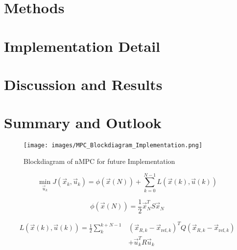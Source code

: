 \documentclass[conference]{IEEEtran}
\begin{document}




\section{Methods}



\section{Implementation Detail}



\section{Discussion and Results}




\section{Summary and Outlook}

\begin{figure}[!h]
    \centering
    \texttt{[image: images/MPC\_Blockdiagram\_Implementation.png]}
    \caption{Blockdiagram of nMPC for future Implementation }
    \label{fig:MPC_Blockdiagram_Implementation}
\end{figure}


\newblock


\begin{equation}
\min_{\vec{u}_k} J(\vec{x}_k, \vec{u}_k) = \phi(\vec{x}(N)) + \sum_{k=0}^{N-1} L(\vec{x}(k), \vec{u}(k))
\end{equation}

\begin{equation}
\label{eq:phi_definition}
\phi(\vec{x}(N)) = \frac{1}{2} \vec{x}_N^T S \vec{x}_N
\end{equation}



\begin{equation}
\label{eq:L_function}
\begin{aligned}
L(\vec{x}(k), \vec{u}(k)) = \frac{1}{2} \sum_{k}^{k+N-1} &
(\vec{x}_{R,k} - \vec{x}_{\text{ref},k})^T Q (\vec{x}_{R,k} - \vec{x}_{\text{ref},k}) \\
&+ \vec{u}_k^T R \vec{u}_k
\end{aligned}
\end{equation}
\end{document}
